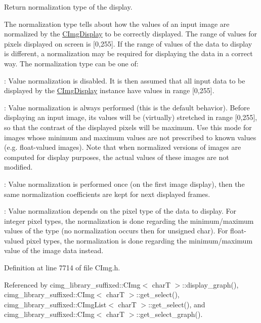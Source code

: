Return normalization type of the display. 

The normalization type tells about how the values of an input image are normalized by the \hyperlink{structcimg__library__suffixed_1_1CImgDisplay}{C\+Img\+Display} to be correctly displayed. The range of values for pixels displayed on screen is {\ttfamily \mbox{[}0,255\mbox{]}}. If the range of values of the data to display is different, a normalization may be required for displaying the data in a correct way. The normalization type can be one of\+:
\begin{DoxyItemize}
\item {}\+: Value normalization is disabled. It is then assumed that all input data to be displayed by the \hyperlink{structcimg__library__suffixed_1_1CImgDisplay}{C\+Img\+Display} instance have values in range {\ttfamily \mbox{[}0,255\mbox{]}}.
\item {}\+: Value normalization is always performed (this is the default behavior). Before displaying an input image, its values will be (virtually) stretched in range {\ttfamily \mbox{[}0,255\mbox{]}}, so that the contrast of the displayed pixels will be maximum. Use this mode for images whose minimum and maximum values are not prescribed to known values (e.\+g. float-\/valued images). Note that when normalized versions of images are computed for display purposes, the actual values of these images are not modified.
\item {}\+: Value normalization is performed once (on the first image display), then the same normalization coefficients are kept for next displayed frames.
\item {}\+: Value normalization depends on the pixel type of the data to display. For integer pixel types, the normalization is done regarding the minimum/maximum values of the type (no normalization occurs then for {\ttfamily unsigned char}). For float-\/valued pixel types, the normalization is done regarding the minimum/maximum value of the image data instead. 
\end{DoxyItemize}

Definition at line 7714 of file C\+Img.\+h.



Referenced by cimg\+\_\+library\+\_\+suffixed\+::\+C\+Img$<$ char\+T $>$\+::display\+\_\+graph(), cimg\+\_\+library\+\_\+suffixed\+::\+C\+Img$<$ char\+T $>$\+::get\+\_\+select(), cimg\+\_\+library\+\_\+suffixed\+::\+C\+Img\+List$<$ char\+T $>$\+::get\+\_\+select(), and cimg\+\_\+library\+\_\+suffixed\+::\+C\+Img$<$ char\+T $>$\+::get\+\_\+select\+\_\+graph().

